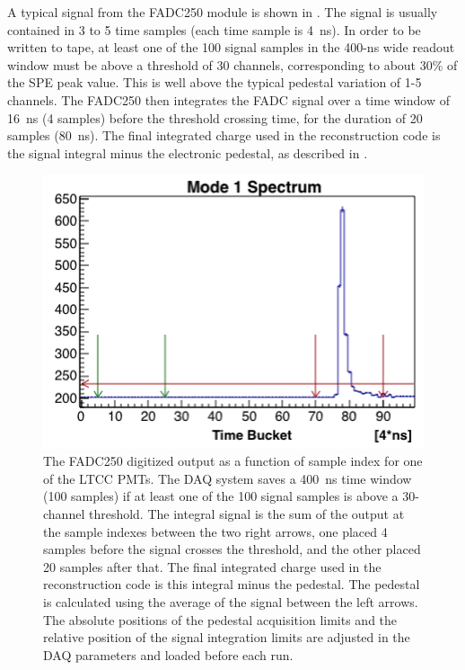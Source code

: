 A typical signal from the FADC250 module is shown in . The signal is usually contained in 3 to 5 time samples
(each time sample is 4~ns). In order to be written to tape, at least one of the 100 signal samples in the 400-ns wide
readout window must be above a threshold of 30 channels, corresponding to about 30\% of the SPE peak value.
This is well above the typical pedestal variation of 1-5 channels. The FADC250 then integrates the FADC signal over
a time window of 16~ns (4 samples) before the threshold crossing time, for the duration of 20 samples (80~ns). The
final integrated charge used in the reconstruction code is the signal integral minus the electronic pedestal, as
described in .

\begin{figure}[H]
	\centering
	\includegraphics[width=0.99\columnwidth, height=0.6\columnwidth]{img/fadc.png}
	\caption{The FADC250 digitized output as a function of sample index for one of the LTCC PMTs.
          The DAQ system saves a 400~ns time window (100 samples) if at least one of the 100 signal samples is
          above a 30-channel threshold. The integral signal is the sum of the output at the sample indexes between
          the two right arrows, one placed 4 samples before the signal crosses the threshold, and the other placed
          20 samples after that. The final integrated charge used in the reconstruction code is this integral minus
          the pedestal. The pedestal is calculated using the average of the signal between the left arrows. The
          absolute positions of the pedestal acquisition limits and the relative position of the signal integration
          limits are adjusted in the DAQ parameters and loaded before each run.}
	\label{fig:fadc}
\end{figure}

